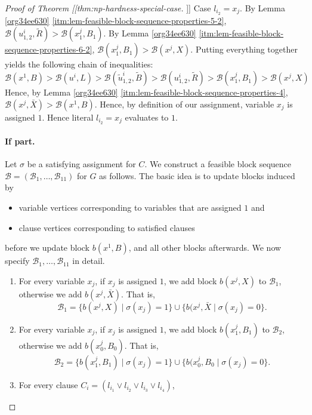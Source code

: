 \documentclass[fontsize=11pt,paper=a4]{book}
\begin{document}
\begin{proof}[Proof of Theorem [[thm:np-hardness-special-case]]]
Case \(l_{i_2}=x_j\).
By Lemma \ref{org34ee630} \ref{itm:lem-feasible-block-sequence-properties-5-2}, \(\mathcal{B}(u_{1,2}^i,\tilde{R})>\mathcal{B}(x_1^j,B_1)\).
By Lemma \ref{org34ee630} \ref{itm:lem-feasible-block-sequence-properties-6-2}, \(\mathcal{B}(x_1^j,B_1)>\mathcal{B}(x^j,X)\).
Putting everything together yields the following chain of inequalities:
\[
\mathcal{B}(x^1,B)>
\mathcal{B}(u^i,L)>
\mathcal{B}(\tilde{u}_{1,2}^i,\tilde{B})>
\mathcal{B}(u_{1,2}^i,\tilde{R})>
\mathcal{B}(x_1^j,B_1)>
\mathcal{B}(x^j,X)
\]
Hence, by Lemma \ref{org34ee630} \ref{itm:lem-feasible-block-sequence-properties-4}, \(\mathcal{B}(x^j,\bar{X})>\mathcal{B}(x^1,B)\).
Hence, by definition of our assignment, variable \(x_j\) is assigned \(1\).
Hence literal \(l_{i_2}=x_j\) evaluates to \(1\).

\paragraph{If part.}
Let \(\sigma\) be a satisfying assignment for \(C\).
We construct a feasible block sequence \(\mathcal{B}=(\mathscr{B}_1,\dots,\mathscr{B}_{11})\) for \(G\) as follows.
The basic idea is to update blocks induced by

\begin{itemize}
\item variable vertices corresponding to variables that are assigned \(1\) and

\item clause vertices corresponding to satisfied clauses
\end{itemize}


before we update block \(b(x^1,B)\), and all other blocks afterwards.
We now specify \(\mathscr{B}_1,\dots,\mathscr{B}_{11}\) in detail.

\begin{enumerate}
\item For every variable \(x_j\), if \(x_j\) is assigned \(1\), we add block \(b(x^j,X)\) to \(\mathscr{B}_1\), otherwise we add \(b(x^j,\bar{X})\).
That is,
\[
   \mathscr{B}_1=\{b(x^j,X)\mid\sigma(x_j)=1\}\cup\{b(x^j,\bar{X}\mid\sigma(x_j)=0\}.
   \]

\item For every variable \(x_j\), if \(x_j\) is assigned \(1\), we add block \(b(x_1^j,B_1)\) to \(\mathscr{B}_2\), otherwise we add \(b(x_0^j,B_0)\).
That is,
\[
   \mathscr{B}_2=\{b(x_1^j,B_1)\mid\sigma(x_j)=1\}\cup\{b(x_0^j,B_0\mid\sigma(x_j)=0\}.
   \]

\item For every clause \(C_i=(l_{i_1}\vee l_{i_2}\vee l_{i_3}\vee l_{i_4})\),


\end{enumerate}
\end{proof}
\end{document}
